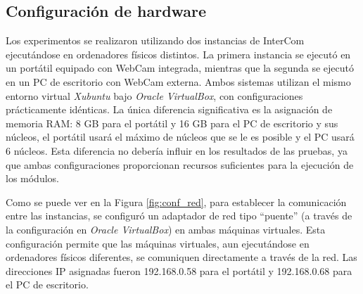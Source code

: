 \label{sec:resultados_y_discusion}

\subsection{Configuración de hardware}

Los experimentos se realizaron utilizando dos instancias de InterCom ejecutándose en ordenadores físicos distintos. La primera instancia se ejecutó en un portátil equipado con WebCam integrada, mientras que la segunda se ejecutó en un PC de escritorio con WebCam externa. Ambos sistemas utilizan el mismo entorno virtual \textit{Xubuntu} bajo \textit{Oracle VirtualBox}, con configuraciones prácticamente idénticas. La única diferencia significativa es la asignación de memoria RAM: 8 GB para el portátil y 16 GB para el PC de escritorio y sus núcleos, el portátil usará el máximo de núcleos que se le es posible y el PC usará 6 núcleos. Esta diferencia no debería influir en los resultados de las pruebas, ya que ambas configuraciones proporcionan recursos suficientes para la ejecución de los módulos.
\vspace{\baselineskip}

Como se puede ver en la Figura \ref{fig:conf_red}, para establecer la comunicación entre las instancias, se configuró un adaptador de red tipo ``puente'' (a través de la configuración en \textit{Oracle VirtualBox}) en ambas máquinas virtuales. Esta configuración permite que las máquinas virtuales, aun ejecutándose en ordenadores físicos diferentes, se comuniquen directamente a través de la red. Las direcciones IP asignadas fueron 192.168.0.58 para el portátil y 192.168.0.68 para el PC de escritorio.

